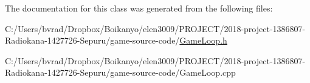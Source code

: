 The documentation for this class was generated from the following files\+:\begin{DoxyCompactItemize}
\item 
C\+:/\+Users/bvrad/\+Dropbox/\+Boikanyo/elen3009/\+P\+R\+O\+J\+E\+C\+T/2018-\/project-\/1386807-\/\+Radiokana-\/1427726-\/\+Sepuru/game-\/source-\/code/\mbox{\hyperlink{_game_loop_8h}{Game\+Loop.\+h}}\item 
C\+:/\+Users/bvrad/\+Dropbox/\+Boikanyo/elen3009/\+P\+R\+O\+J\+E\+C\+T/2018-\/project-\/1386807-\/\+Radiokana-\/1427726-\/\+Sepuru/game-\/source-\/code/Game\+Loop.\+cpp\end{DoxyCompactItemize}

